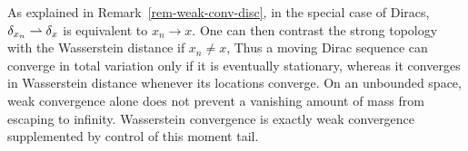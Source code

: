 As explained in Remark~\ref{rem-weak-conv-disc}, in the special case of Diracs, $\delta_{x_n} \rightharpoonup \delta_x$  is equivalent to $x_n \rightarrow x$. One can then contrast the strong topology with the Wasserstein distance if $x_n \neq x$,
Thus a moving Dirac sequence can converge in total variation only if it is eventually stationary, whereas it converges in Wasserstein distance whenever its locations converge. On an unbounded space, weak convergence alone does not prevent a vanishing amount of mass from escaping to infinity. Wasserstein convergence is exactly weak convergence supplemented by control of this moment tail.

